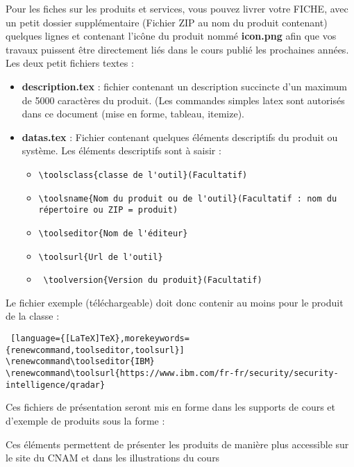 Pour les fiches sur les produits et services,  vous pouvez livrer votre FICHE, avec un petit dossier  supplémentaire (Fichier ZIP au nom du produit contenant)  quelques lignes et contenant l'icône du produit nommé \textbf{icon.png} afin que vos travaux puissent être directement liés dans le cours publié les prochaines années. Les deux petit fichiers textes  :

\begin{itemize}

  \item  \textbf{description.tex } : fichier contenant un description succincte d'un maximum de 5000 caractères  du produit. (Les commandes simples latex sont autorisés dans ce document (mise en forme, tableau, itemize).
  \item  \textbf{datas.tex} : Fichier contenant quelques éléments descriptifs du produit ou système. Les éléments descriptifs sont à saisir :
\begin{itemize}
 \item \verb|\toolsclass{classe de l'outil}(Facultatif)|
 \item \verb|\toolsname{Nom du produit ou de l'outil}(Facultatif : nom du  répertoire ou ZIP = produit)|
 \item \verb|\toolseditor{Nom de l'éditeur}|
\item \verb|\toolsurl{Url de l'outil}|
\item \ \verb|\toolversion{Version du produit}(Facultatif)|
\end{itemize}
\end{itemize}

Le fichier  exemple (téléchargeable)   doit donc contenir au moins pour le produit  de la classe  : 

\begin{lstlisting} [language={[LaTeX]TeX},morekeywords={renewcommand,toolseditor,toolsurl}]
\renewcommand\toolseditor{IBM}
\renewcommand\toolsurl{https://www.ibm.com/fr-fr/security/security-intelligence/qradar}
\end{lstlisting}

Ces fichiers de présentation seront mis en forme dans les supports de cours et d'exemple de produits sous la forme :


Ces éléments permettent de présenter les produits de manière plus accessible sur le site du CNAM et dans les illustrations du cours

